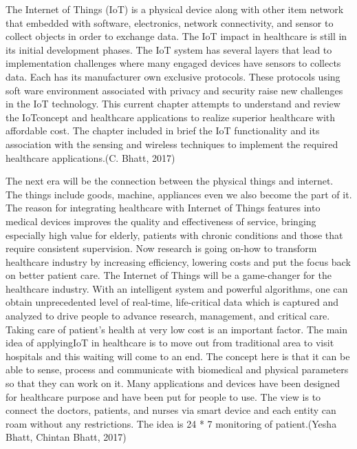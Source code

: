 The Internet of Things (IoT) is a physical device along with other item network that embedded with software, electronics, network connectivity, and sensor to collect objects in order to exchange data. The IoT impact in healthcare is still in its initial development phases. The IoT system has several layers that lead to implementation challenges where many engaged devices have sensors to collects data. Each has its manufacturer own exclusive protocols. These protocols using soft ware environment associated with privacy and security raise new challenges in the IoT technology. This current chapter attempts to understand and review the IoTconcept and healthcare applications to realize superior healthcare with affordable cost. The chapter included in brief the IoT functionality and its association with the sensing and wireless techniques to implement the required healthcare applications.(C. Bhatt, 2017)
\newline

The next era will be the connection between the physical things and internet. The things include goods, machine, appliances even we also become the part of it. The reason for integrating healthcare with Internet of Things features into medical devices improves the quality and effectiveness of service, bringing especially high value for elderly, patients with chronic conditions and those that require consistent supervision. Now research is going on-how to transform healthcare industry by increasing efficiency, lowering costs and put the focus back on better patient care. The Internet of Things will be a game-changer for the healthcare industry. With an intelligent system and powerful algorithms, one can obtain unprecedented level of real-time, life-critical data which is captured and analyzed to drive people to advance research, management, and critical care. Taking care of patient's health at very low cost is an important factor. The main idea of applyingIoT in healthcare is to move out from traditional area to visit hospitals and this waiting will come to an end. The concept here is that it can be able to sense, process and communicate with biomedical and physical parameters so that they can work on it. Many applications and devices have been designed for healthcare purpose and have been put for people to use. The view is to connect the doctors, patients, and nurses via smart device and each entity can roam without any restrictions. The idea is 24 * 7 monitoring of patient.(Yesha Bhatt, Chintan Bhatt, 2017)
\newline

